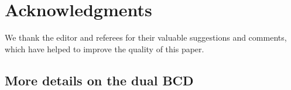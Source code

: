 \documentclass[10pt]{article}
\begin{document}
\section*{Acknowledgments}

We thank the editor and referees for their valuable suggestions and comments, which have helped to improve the quality of this paper.



\begin{appendices}


\section{More details on the dual BCD}\label{apd-BCD}


\end{appendices}
\end{document}
